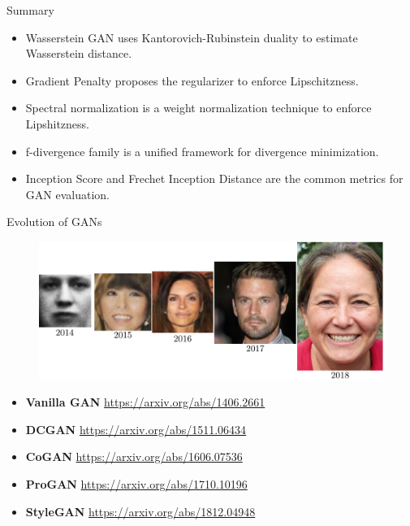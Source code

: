 \documentclass{beamer}
\begin{document}
\begin{frame}{Summary}
	\begin{itemize}
		\item Wasserstein GAN uses Kantorovich-Rubinstein duality to estimate Wasserstein distance.
		\item Gradient Penalty proposes the regularizer to enforce Lipschitzness.
		\item Spectral normalization is a weight normalization technique to enforce Lipshitzness.
		\item f-divergence family is a unified framework for divergence minimization.
		\item Inception Score and Frechet Inception Distance are the common metrics for GAN evaluation.
	\end{itemize}
\end{frame}
\begin{frame}{Evolution of GANs}
	\begin{figure}
		\centering
		\includegraphics[width=\linewidth]{figs/gan_evolution}
	\end{figure}
	\begin{itemize}
		\item \textbf{Vanilla GAN} \href{https://arxiv.org/abs/1406.2661}{https://arxiv.org/abs/1406.2661}
		\item \textbf{DCGAN} \href{https://arxiv.org/abs/1511.06434}{https://arxiv.org/abs/1511.06434}
		\item \textbf{CoGAN} \href{https://arxiv.org/abs/1606.07536}{https://arxiv.org/abs/1606.07536}
		\item \textbf{ProGAN} \href{https://arxiv.org/abs/1710.10196}{https://arxiv.org/abs/1710.10196} 
		\item \textbf{StyleGAN} \href{https://arxiv.org/abs/1812.04948}{https://arxiv.org/abs/1812.04948}
	\end{itemize}
\end{frame}
\end{document}
